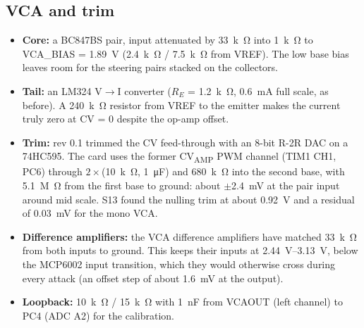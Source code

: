 \documentclass[11pt,a4paper]{article}
\newcommand{\sub}[1]{\textsubscript{#1}}
\begin{document}
\subsection{VCA and trim}
\begin{itemize}
  \item \textbf{Core:} a BC847BS pair, input attenuated by \SI{33}{k\ohm} into \SI{1}{k\ohm} to VCA\_BIAS = \SI{1.89}{V}
    (\SI{2.4}{k\ohm} / \SI{7.5}{k\ohm} from VREF). The low base bias leaves room for the steering pairs stacked on
    the collectors.
  \item \textbf{Tail:} an LM324 V$\to$I converter ($R_E$ = \SI{1.2}{k\ohm}, \SI{0.6}{mA} full scale, as before). A
    \SI{240}{k\ohm} resistor from VREF to the emitter makes the current truly zero at CV = 0 despite the op-amp
    offset.
  \item \textbf{Trim:} rev 0.1 trimmed the CV feed-through with an 8-bit R-2R DAC on a 74HC595. The card uses the
    former CV\sub{AMP} PWM channel (TIM1 CH1, PC6) through $2\times$(\SI{10}{k\ohm}, \SI{1}{\micro F}) and
    \SI{680}{k\ohm} into the second base, with \SI{5.1}{M\ohm} from the first base to ground: about
    $\pm$\SI{2.4}{mV} at the pair input around mid scale. S13 found the nulling trim at about \SI{0.92}{V} and a
    residual of \SI{0.03}{mV} for the mono VCA.
  \item \textbf{Difference amplifiers:} the VCA difference amplifiers have matched \SI{33}{k\ohm} from both inputs to
    ground. This keeps their inputs at \SIrange{2.44}{3.13}{V}, below the MCP6002 input transition, which they would
    otherwise cross during every attack (an offset step of about \SI{1.6}{mV} at the output).
  \item \textbf{Loopback:} \SI{10}{k\ohm} / \SI{15}{k\ohm} with \SI{1}{nF} from VCAOUT (left channel) to PC4 (ADC A2)
    for the calibration.
\end{itemize}
\end{document}
